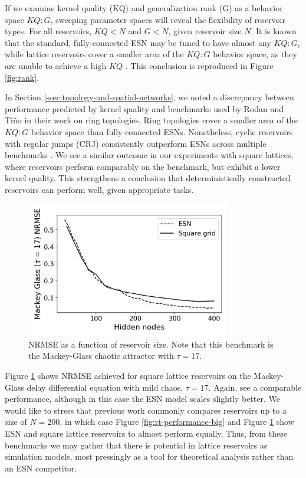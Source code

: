 If we examine kernel quality (KQ) and generalization rank (G) as a behavior
space $KQ:G$, sweeping parameter spaces will reveal the flexibility of reservoir
types. For all reservoirs, $KQ < N$ and $G < N$, given reservoir size $N$. It is
known that the standard, fully-connected ESN may be tuned to have almost any
$KQ:G$, while lattice reservoirs cover a smaller area of the $KQ:G$ behavior
space, as they are unable to achieve a high $KQ$
\cite{mcquillan_role_2019}. This conclusion is reproduced in Figure
\ref{fig:rank}.

In Section \ref{ssec:topology-and-spatial-networks}, we noted a discrepancy
between performance predicted by kernel quality and benchmarks used by Rodan and
Tiňo in their work on ring topologies. Ring topologies cover a smaller area of
the $KQ:G$ behavior space than fully-connected ESNs. Nonetheless, cyclic
reservoirs with regular jumps (CRJ) consistently outperform ESNs across multiple
benchmarks \cite{rodan_simple_2012}. We see a similar outcome in our experiments
with square lattices, where reservoirs perform comparably on the benchmark, but
exhibit a lower kernel quality. This strengthens a conclusion that
deterministically constructed reservoirs can perform well, given appropriate
tasks.

\begin{figure}[t]
  \centering
  \includegraphics[width=3.5in]{figures/mg17.png}
  \caption{
    NRMSE as a function of reservoir size. Note that this benchmark is the
Mackey-Glass chaotic attractor with $\tau = 17$.
  }
  \label{fig:mg17}
\end{figure}

Figure \ref{fig:mg17} shows NRMSE achieved for square lattice reservoirs on the
Mackey-Glass delay differential equation with mild chaos, $\tau = 17$. Again,
see a comparable performance, although in this case the ESN model scales
slightly better. We would like to stress that previous work commonly compares
reservoirs up to a size of $N = 200$, in which case Figure
\ref{fig:rt-performance-big} and Figure \ref{fig:mg17} show ESN and square
lattice reservoirs to almost perform equally. Thus, from these benchmarks we may
gather that there is potential in lattice reservoirs as simulation models, most
pressingly as a tool for theoretical analysis rather than an ESN competitor.

